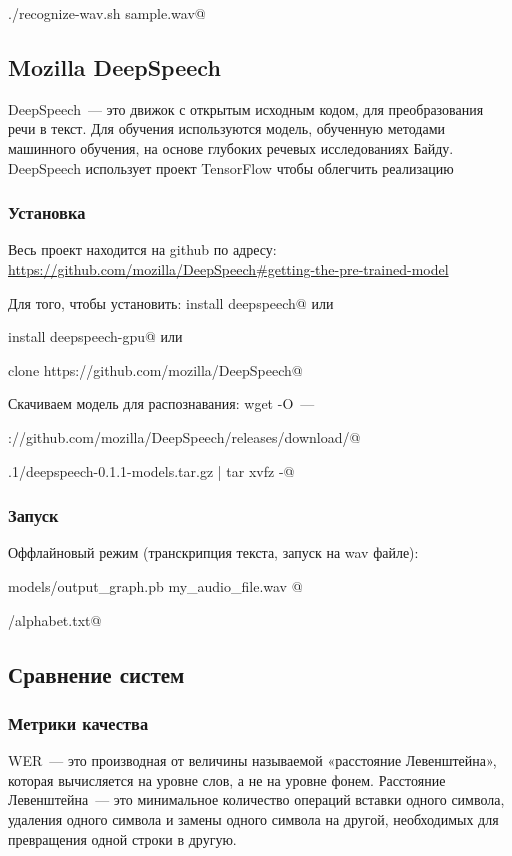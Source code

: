 \documentclass[10pt, a5paper]{article}
\begin{document}
\verb@./recognize-wav.sh sample.wav@

\subsection*{Mozilla DeepSpeech}

DeepSpeech~--- это движок с открытым исходным кодом, для преобразования речи в текст. Для обучения используются модель, обученную методами машинного обучения, на основе глубоких речевых исследованиях Байду. DeepSpeech использует проект TensorFlow чтобы облегчить реализацию

\subsubsection*{Установка}

Весь проект находится на github по адресу: \url{https://github.com/mozilla/DeepSpeech#getting-the-pre-trained-model}

Для того, чтобы установить:
\verb@pip install deepspeech@
или
				
\verb@pip install deepspeech-gpu@
или
	
\verb@git clone https://github.com/mozilla/DeepSpeech@

Скачиваем модель для распознавания:
wget -O~--- 

\verb@https://github.com/mozilla/DeepSpeech/releases/download/@

.1/deepspeech-0.1.1-models.tar.gz | tar xvfz -@

\subsubsection*{Запуск}

Оффлайновый режим (транскрипция текста, запуск на wav файле):

\verb@deepspeech models/output_graph.pb my_audio_file.wav @
 
\verb@models/alphabet.txt@

\subsection*{Сравнение систем}

\subsubsection*{Метрики качества}

WER~--- это производная от величины называемой «расстояние Левенштейна», которая вычисляется на уровне слов, а не на уровне фонем. Расстояние Левенштейна~--- это минимальное количество операций вставки одного символа, удаления одного символа и замены одного символа на другой, необходимых для превращения одной строки в другую.
\end{document}
